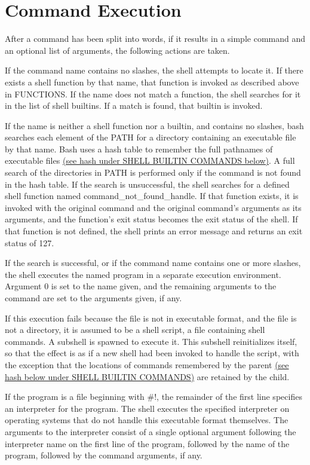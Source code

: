 \section{Command Execution}\label{sec:commandexecution}
After a command has been split into words, if it results in a simple command and an optional list of arguments, the following actions are taken.

If the command name contains no slashes, the shell attempts to locate it. If there exists a shell function by that name, that function is invoked as described above in FUNCTIONS. If the name does not match a function, the shell searches for it in the list of shell builtins. If a match is found, that builtin is invoked.

If the name is neither a shell function nor a builtin, and contains no slashes, bash searches each element of the PATH for a directory containing an executable file by that name. Bash uses a hash table to remember the full pathnames of executable files \hyperref[sec:shellbuiltincommands]{(see hash under SHELL BUILTIN COMMANDS below)}. A full search of the directories in PATH is performed only if the command is not found in the hash table. If the search is unsuccessful, the shell searches for a defined shell function named command\_not\_found\_handle. If that function exists, it is invoked with the original command and the original command's arguments as its arguments, and the function's exit status becomes the exit status of the shell. If that function is not defined, the shell prints an error message and returns an exit status of 127.

If the search is successful, or if the command name contains one or more slashes, the shell executes the named program in a separate execution environment. Argument 0 is set to the name given, and the remaining arguments to the command are set to the arguments given, if any.

If this execution fails because the file is not in executable format, and the file is not a directory, it is assumed to be a shell script, a file containing shell commands. A subshell is spawned to execute it. This subshell reinitializes itself, so that the effect is as if a new shell had been invoked to handle the script, with the exception that the locations of commands remembered by the parent \hyperref[sec:shellbuiltincommands]{(see hash below under SHELL BUILTIN COMMANDS)} are retained by the child.

If the program is a file beginning with \#!, the remainder of the first line specifies an interpreter for the program. The shell executes the specified interpreter on operating systems that do not handle this executable format themselves. The arguments to the interpreter consist of a single optional argument following the interpreter name on the first line of the program, followed by the name of the program, followed by the command arguments, if any.